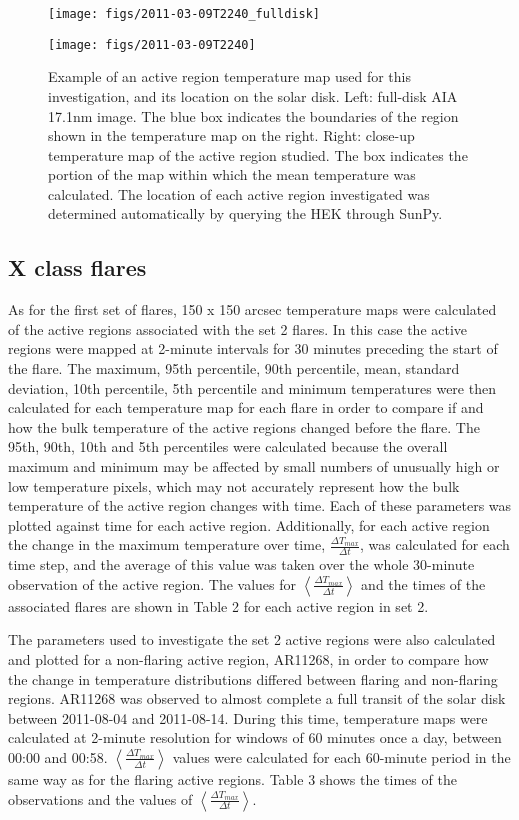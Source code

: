 \documentclass[namedreferences]{solarphysics}
\begin{document}
\begin{article}
\begin{figure}
  \centerline{\texttt{[image: figs/2011-03-09T2240\_fulldisk]}}
  \centerline{\texttt{[image: figs/2011-03-09T2240]}}
\caption{Example of an active region temperature map used for this investigation, and its location on the solar disk.
Left: full-disk AIA 17.1nm image.
The blue box indicates the boundaries of the region shown in the temperature map on the right.
Right: close-up temperature map of the active region studied.
The box indicates the portion of the map within which the mean temperature was calculated.
The location of each active region investigated was determined automatically by querying the HEK through SunPy.\label{fig:ar-demo}}
\end{figure}

\subsection{X class flares}
As for the first set of flares, 150 x 150 arcsec temperature maps were calculated of the active regions associated with the set 2 flares.
In this case the active regions were mapped at 2-minute intervals for 30 minutes preceding the start of the flare.
The maximum, 95th percentile, 90th percentile, mean, standard deviation, 10th percentile, 5th percentile and minimum temperatures were then calculated for each temperature map for each flare in order to compare if and how the bulk temperature of the active regions changed before the flare.
The 95th, 90th, 10th and 5th percentiles were calculated because the overall maximum and minimum may be affected by small numbers of unusually high or low temperature pixels, which may not accurately represent how the bulk temperature of the active region changes with time.
Each of these parameters was plotted against time for each active region.
Additionally, for each active region the change in the maximum temperature over time, $\frac{\Delta T_{max}}{\Delta t}$, was calculated for each time step, and the average of this value was taken over the whole 30-minute observation of the active region.
The values for $\left\langle \frac{\Delta T_{max}}{\Delta t}\right\rangle$ and the times of the associated flares are shown in Table 2 for each active region in set 2. %

The parameters used to investigate the set 2 active regions were also calculated and plotted for a non-flaring active region, AR11268, in order to compare how the change in temperature distributions differed between flaring and non-flaring regions.
AR11268 was observed to almost complete a full transit of the solar disk between 2011-08-04 and 2011-08-14.
During this time, temperature maps were calculated at 2-minute resolution for windows of 60 minutes once a day, between 00:00 and 00:58. $\left\langle \frac{\Delta T_{max}}{\Delta t}\right\rangle$ values were calculated for each 60-minute period in the same way as for the flaring active regions.
Table 3 shows the times of the observations and the values of $\left\langle \frac{\Delta T_{max}}{\Delta t}\right\rangle$.


\end{article}
\end{document}

